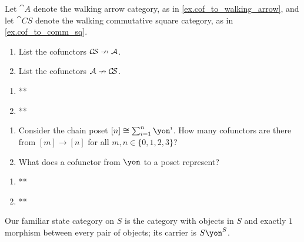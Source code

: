 \documentclass[Book-Poly]{subfiles}
\begin{document}
\begin{exercise}
Let $\cat{A}$ denote the walking arrow category, as in \cref{ex.cof_to_walking_arrow}, and let $\cat{C\!S}$ denote the walking commutative square category, as in \cref{ex.cof_to_comm_sq}.
\begin{enumerate}
    \item List the cofunctors $\mathcal{C\!S}\nrightarrow\mathcal{A}$.
    \item List the cofunctors $\mathcal{A}\nrightarrow\mathcal{C\!S}$.\qedhere
\end{enumerate}
\begin{solution}
\begin{enumerate}
    \item **
    \item **
\end{enumerate}
\end{solution}
\end{exercise}

\begin{exercise}
\begin{enumerate}
	\item Consider the chain poset $[n]\cong\sum_{i=1}^n\yon^i$.
	How many cofunctors are there from $[m]\to[n]$ for all $m,n\in\{0,1,2,3\}$?
	\item What does a cofunctor from $\yon$ to a poset represent? %
\qedhere
\end{enumerate}
\begin{solution}
\begin{enumerate}
    \item **
    \item **
\end{enumerate}
\end{solution}
\end{exercise}

\begin{example}
Our familiar state category on $S$ is the category with objects in $S$ and exactly $1$ morphism between every pair of objects; its carrier is $S\yon^S$.
\end{example}
\end{document}
